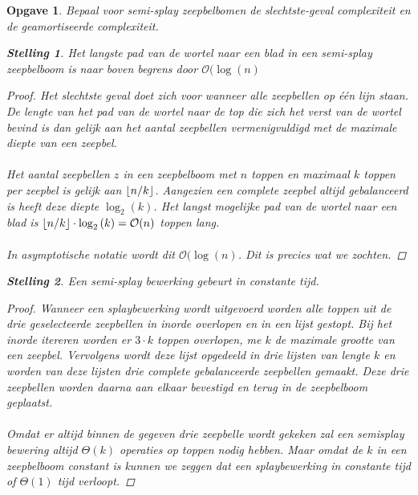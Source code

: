 \documentclass[12pt,hidelinks]{article}
\DeclarePairedDelimiter\floor{\lfloor}{\rfloor}
\newtheorem{opgave}{Opgave}
\newtheorem{stelling}{Stelling}
\begin{document}
    \begin{opgave}
        Bepaal voor semi-splay zeepbelbomen de slechtste-geval complexiteit en de geamortiseerde complexiteit.
        \begin{stelling}Het langste pad van de wortel naar een blad in een semi-splay zeepbelboom is naar boven begrens door $\mathcal{O}(\log(n)$ \label{stelling1}
            \begin{proof}Het slechtste geval doet zich voor wanneer alle zeepbellen op één lijn staan.
                De lengte van het pad van de wortel naar de top die zich het verst van de wortel bevind is dan gelijk aan het aantal zeepbellen vermenigvuldigd met de maximale diepte van een zeepbel.
                \\
                \\
                Het aantal zeepbellen $z$ in een zeepbelboom met $n$ toppen en maximaal $k$ toppen per zeepbel is gelijk aan $\floor{n/k}$.
                Aangezien een complete zeepbel altijd gebalanceerd is heeft deze diepte $\log_2{(k)}$. 
                Het langst mogelijke pad van de wortel naar een blad is $\floor{n/k}\cdot\log_2{(k)} = \mathcal{O}(n)$ toppen lang.
                \\
                \\
                In asymptotische notatie wordt dit $\mathcal{O}(\log(n)$. Dit is precies wat we zochten.
            \end{proof}
        \end{stelling}
        \begin{stelling} Een semi-splay bewerking gebeurt in constante tijd. \label{semisplay}
            \begin{proof}
                Wanneer een splaybewerking wordt uitgevoerd worden alle toppen uit de drie geselecteerde zeepbellen in inorde overlopen en in een lijst gestopt.
                Bij het inorde itereren worden er $3\cdot k$ toppen overlopen, me $k$ de maximale grootte van een zeepbel.
                Vervolgens wordt deze lijst opgedeeld in drie lijsten van lengte $k$ en worden van deze lijsten drie complete gebalanceerde zeepbellen gemaakt.
                Deze drie zeepbellen worden daarna aan elkaar bevestigd en terug in de zeepbelboom geplaatst.
                \\
                \\
                Omdat er altijd binnen de gegeven drie zeepbelle wordt gekeken zal een semisplay bewering altijd $\Theta(k)$ operaties op toppen nodig hebben.
                Maar omdat de $k$ in een zeepbelboom constant is kunnen we zeggen dat een splaybewerking in constante tijd of $\Theta(1)$ tijd verloopt.

\end{proof}
\end{stelling}
\end{opgave}
\end{document}
